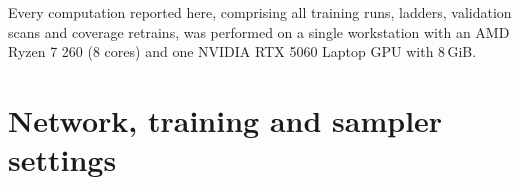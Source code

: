 \documentclass[prd, twocolumn, superscriptaddress, nofootinbib,floatfix]{revtex4-2}
\begin{document}
Every computation reported here, comprising all training runs, ladders,
validation scans and coverage retrains, was performed on a single workstation
with an AMD Ryzen 7 260 (8 cores) and one NVIDIA RTX 5060 Laptop GPU with
$8$\,GiB.





\clearpage

\appendix

\section{Network, training and sampler settings}
\label{app:settings}
\end{document}
